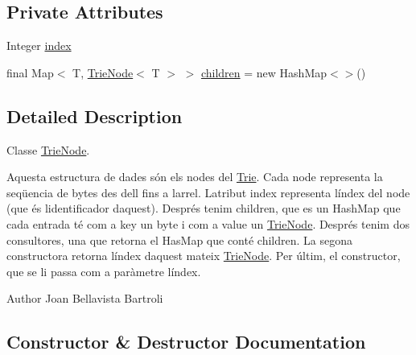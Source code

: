 \subsection*{Private Attributes}
\begin{DoxyCompactItemize}
\item 
Integer \hyperlink{classdomini_1_1utils_1_1TrieNode_a9c247bc6568131e5e6ad0758adb67bfa}{index}
\item 
final Map$<$ T, \hyperlink{classdomini_1_1utils_1_1TrieNode}{Trie\+Node}$<$ T $>$ $>$ \hyperlink{classdomini_1_1utils_1_1TrieNode_ae64d9c12696f526eecb3ff15aa290640}{children} = new Hash\+Map$<$$>$()
\end{DoxyCompactItemize}


\subsection{Detailed Description}
Classe \hyperlink{classdomini_1_1utils_1_1TrieNode}{Trie\+Node}. 

Aquesta estructura de dades són els nodes del \hyperlink{classdomini_1_1utils_1_1Trie}{Trie}. Cada node representa la seqüencia de bytes des d\textquotesingle{}ell fins a l\textquotesingle{}arrel. L\textquotesingle{}atribut index representa l\textquotesingle{}índex del node (que és l\textquotesingle{}identificador d\textquotesingle{}aquest). Després tenim children, que es un Hash\+Map que cada entrada té com a key un byte i com a value un \hyperlink{classdomini_1_1utils_1_1TrieNode}{Trie\+Node}. Després tenim dos consultores, una que retorna el Has\+Map que conté children. La segona constructora retorna l\textquotesingle{}índex d\textquotesingle{}aquest mateix \hyperlink{classdomini_1_1utils_1_1TrieNode}{Trie\+Node}. Per últim, el constructor, que se li passa com a paràmetre l\textquotesingle{}índex.

\begin{DoxyAuthor}{Author}
Joan Bellavista Bartroli 
\end{DoxyAuthor}


\subsection{Constructor \& Destructor Documentation}
\mbox{\label{classdomini_1_1utils_1_1TrieNode_af9a18353151b5e3dea5966f50629319a}} 
